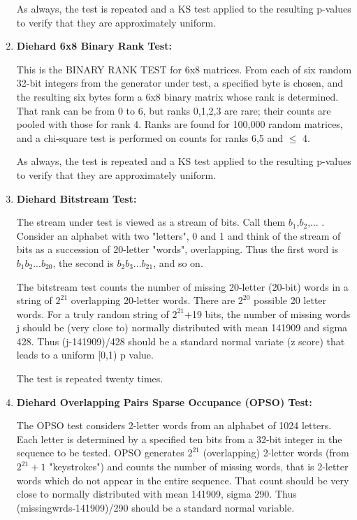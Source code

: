 \documentclass[titlepage, 11pt]{article}
\begin{document}
\begin{enumerate}
As always, the test is repeated and a KS test applied to the resulting p-values to verify that they are approximately uniform.


\item {\textbf{Diehard 6x8 Binary Rank Test:}}


This is the BINARY RANK TEST for 6x8 matrices.  From each of six random 32-bit integers from the generator under test, a specified byte is chosen, and the resulting six bytes form a 6x8 binary matrix whose rank is determined. That rank can be from 0 to 6, but ranks 0,1,2,3 are rare; their counts are pooled with those for rank 4. Ranks are found for 100,000 random matrices, and a chi-square test is performed on counts for ranks 6,5 and $\leq$ 4.


As always, the test is repeated and a KS test applied to the resulting p-values to verify that they are approximately uniform.


\item {\textbf{Diehard Bitstream Test:}}


The stream under test is viewed as a stream of bits. Call them $b_1$,$b_2$,... .  Consider an alphabet with two "letters", 0 and 1 and think of the stream of bits as a succession of 20-letter "words", overlapping.  Thus the first word is $b_1b_2...b_{20}$, the second is $b_2b_3...b_{21}$, and so on.  


The bitstream test counts the number of missing 20-letter (20-bit) words in a string of $2^{21}$ overlapping 20-letter words.  There are $2^{20}$ possible 20 letter words.  For a truly random string of $2^{21}$+19 bits, the number of missing words j should be (very close to) normally distributed with mean 141909 and sigma 428. Thus (j-141909)/428 should be a standard normal variate (z score) that leads to a uniform [0,1) p value.  


The test is repeated twenty times.


\item {\textbf{Diehard Overlapping Pairs Sparse Occupance (OPSO) Test:}}


The OPSO test considers 2-letter words from an alphabet of 1024 letters.  Each letter is determined by a specified ten bits from a 32-bit integer in the sequence to be tested. OPSO generates  $2^{21}$ (overlapping) 2-letter words  (from $2^{21}+1$ "keystrokes")  and counts the number of missing words, that is 2-letter words which do not appear in the entire sequence. That count should be very close to normally distributed with mean 141909, sigma 290. Thus (missingwrds-141909)/290 should be a standard normal variable. 



\end{enumerate}
\end{document}
